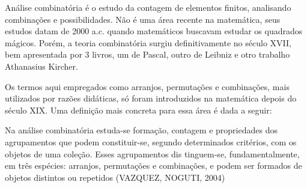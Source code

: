 Análise combinatória é o estudo da contagem de elementos finitos, analisando combinações e possibilidades. Não é uma área recente na matemática, seus estudos datam de 2000 a.c. quando matemáticos buscavam estudar os quadrados mágicos. Porém, a teoria combinatória surgiu definitivamente no século XVII, bem apresentada por 3 livros, um de Pascal, outro de Leibniz e otro trabalho Athanasius Kircher.

Os termos aqui empregados como arranjos, permutações e combinações, mais utilizados por razões didáticas, só foram introduzidos na matemática depois do século XIX. Uma definição mais concreta para essa área é dada a seguir:

\begin{citacao}
	Na  análise  combinatória  estuda-se  formação,  contagem  e  propriedades  dos  
	agrupamentos que podem constituir-se, segundo determinados critérios, com os objetos 
	de   uma   coleção.   Esses   agrupamentos   dis
	tinguem-se,   fundamentalmente,   em   três   
	espécies: 
	arranjos,  permutações  e  combinações,
	e  podem  ser  formados  de  objetos  
	distintos ou repetidos (VAZQUEZ, NOGUTI, 2004)
\end{citacao}



